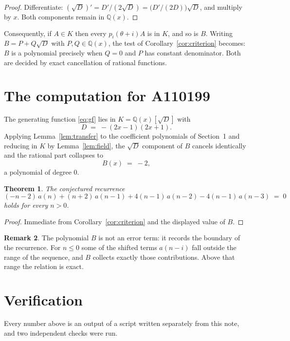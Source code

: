 \documentclass[11pt,a4paper]{article}
\theoremstyle{plain}
\newtheorem{theorem}{Theorem}
\theoremstyle{definition}
\newtheorem{remark}[theorem]{Remark}
\begin{document}
\begin{proof}
Differentiate: $(\sqrt{D})'=D'/(2\sqrt{D})=\bigl(D'/(2D)\bigr)\sqrt{D}$, and multiply by
$x$. Both components remain in $\mathbb{Q}(x)$.
\end{proof}

Consequently, if $A\in K$ then every $p_{i}(\theta+i)A$ is in $K$, and so is $B$. Writing
$B=P+Q\sqrt{D}$ with $P,Q\in\mathbb{Q}(x)$, the test of Corollary~\ref{cor:criterion}
becomes: $B$ is a polynomial precisely when $Q=0$ and $P$ has constant denominator. Both
are decided by exact cancellation of rational functions.

\section{The computation for A110199}

The generating function \eqref{eq:gf} lies in $K=\mathbb{Q}(x)[\sqrt{D}]$ with
\[
D \;=\; - \left(2 x - 1\right) \left(2 x + 1\right) .
\]
Applying Lemma~\ref{lem:transfer} to the coefficient polynomials of Section~1 and reducing
in $K$ by Lemma~\ref{lem:field}, the $\sqrt{D}$ component of $B$ cancels identically and
the rational part collapses to
\[
B(x)\;=\;-2 ,
\]
a polynomial of degree $0$.

\begin{theorem}
The conjectured recurrence
\[
(- n - 2)\,a(n) + (n + 2)\,a(n-1) + 4 \left(n - 1\right)\,a(n-2) -  4 \left(n - 1\right)\,a(n-3) \;=\;0
\]
holds for every $n>0$.
\end{theorem}

\begin{proof}
Immediate from Corollary~\ref{cor:criterion} and the displayed value of $B$.
\end{proof}

\begin{remark}
The polynomial $B$ is not an error term: it records the boundary of the recurrence. For
$n\le0$ some of the shifted terms $a(n-i)$ fall outside the range of the sequence,
and $B$ collects exactly those contributions. Above that range the relation is exact.
\end{remark}

\section{Verification}

Every number above is an output of a script written separately from this note, and two
independent checks were run.
\end{document}
